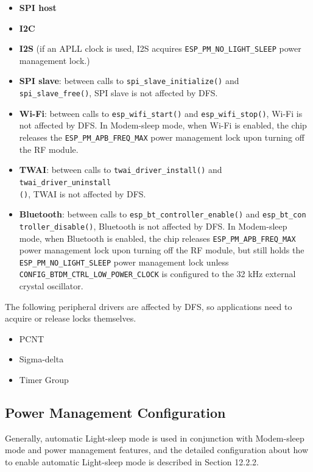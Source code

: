\documentclass[a4paper,12pt,openany]{book}
\begin{document}
\begin{itemize}
    \item \textbf{SPI host}
    \item \textbf{I2C}
    \item \textbf{I2S} (if an APLL clock is used, I2S acquires \verb|ESP_PM_NO_LIGHT_SLEEP| power management lock.)
    \item \textbf{SPI slave}: between calls to \verb|spi_slave_initialize()| and \verb|spi_slave_free()|, SPI slave is not affected by DFS.
    \item \textbf{Wi-Fi}: between calls to \verb|esp_wifi_start()| and \verb|esp_wifi_stop()|, Wi-Fi is not affected by DFS. In Modem-sleep mode, when Wi-Fi is enabled, the chip releases the \verb|ESP_PM_APB_FREQ_MAX| power management lock upon turning off the RF module.
    \item \textbf{TWAI}: between calls to \verb|twai_driver_install()| and \verb|twai_driver_uninstall|\\ \verb|()|, TWAI is not affected by DFS.
    \item \textbf{Bluetooth}: between calls to \verb|esp_bt_controller_enable()| and \verb|esp_bt_con|\\ \verb|troller_disable()|, Bluetooth is not affected by DFS. In Modem-sleep mode, when Bluetooth is enabled, the chip releases \verb|ESP_PM_APB_FREQ_MAX| power management lock upon turning off the RF module, but still holds the \verb|ESP_PM_NO_LIGHT_SLEEP| power management lock unless \verb|CONFIG_BTDM_CTRL_LOW_POWER_CLOCK| is configured to the 32 kHz external crystal oscillator.
\end{itemize}

The following peripheral drivers are affected by DFS, so applications need to acquire or release locks themselves.

\begin{itemize}
    \item  PCNT
    \item Sigma-delta
    \item Timer Group
\end{itemize}

\subsection{Power Management Configuration}
Generally, automatic Light-sleep mode is used in conjunction with Modem-sleep mode and power management features, and the detailed configuration about how to enable automatic Light-sleep mode is described in Section 12.2.2.
\end{document}
